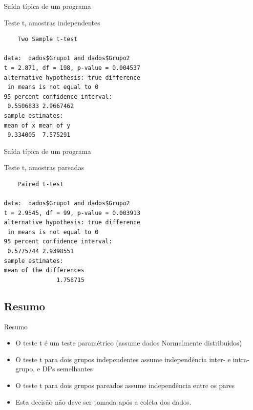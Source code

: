 \documentclass{beamer}
\begin{document}

\begin{frame}[fragile]{Saída típica de um programa}
  \begin{block}{Teste t, amostras independentes}
    \footnotesize
    \begin{verbatim}
	Two Sample t-test

data:  dados$Grupo1 and dados$Grupo2
t = 2.871, df = 198, p-value = 0.004537
alternative hypothesis: true difference 
 in means is not equal to 0
95 percent confidence interval:
 0.5506833 2.9667462
sample estimates:
mean of x mean of y 
 9.334005  7.575291
    \end{verbatim}
  \end{block}
\end{frame}

\begin{frame}[fragile]{Saída típica de um programa}
  \begin{block}{Teste t, amostras pareadas}
    \footnotesize
    \begin{verbatim}
	Paired t-test

data:  dados$Grupo1 and dados$Grupo2
t = 2.9545, df = 99, p-value = 0.003913
alternative hypothesis: true difference 
 in means is not equal to 0
95 percent confidence interval:
 0.5775744 2.9398551
sample estimates:
mean of the differences 
               1.758715
    \end{verbatim}
  \end{block}
\end{frame}


\subsection{Resumo}

\begin{frame}{Resumo}
  \begin{itemize}
  \item O teste t é um teste paramétrico (assume dados Normalmente distribuídos)
  \item O teste t para dois grupos independentes assume independência inter- e intra-grupo, e DPs semelhantes
  \item O teste t para dois grupos pareados assume independência entre os pares
  \item Esta decisão \alert{não} deve ser tomada após a coleta dos dados.
  \end{itemize}
\end{frame}
\end{document}
